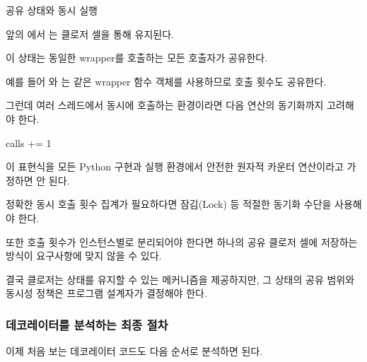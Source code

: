 \begin{dhknote}
\begin{dhksmry}[centered]
공유 상태와 동시 실행
\end{dhksmry}
\end{dhknote}

앞의 에서 는 클로저 셀을 통해 유지된다.

이 상태는 동일한 wrapper를 호출하는 모든 호출자가 공유한다.

예를 들어 와 는 같은 wrapper 함수 객체를 사용하므로 호출 횟수도 공유한다.

그런데 여러 스레드에서 동시에 호출하는 환경이라면 다음 연산의 동기화까지 고려해야 한다.

\begin{dhkcode}
calls += 1
\end{dhkcode}

이 표현식을 모든 Python 구현과 실행 환경에서 안전한 원자적 카운터 연산이라고 가정하면 안 된다.

정확한 동시 호출 횟수 집계가 필요하다면 잠김(Lock) 등 적절한 동기화 수단을 사용해야 한다.

또한 호출 횟수가 인스턴스별로 분리되어야 한다면 하나의 공유 클로저 셀에 저장하는 방식이 요구사항에 맞지 않을 수 있다.

결국 클로저는 상태를 유지할 수 있는 메커니즘을 제공하지만, 그 상태의 공유 범위와 동시성 정책은 프로그램 설계자가 결정해야 한다.

\subsubsection{데코레이터를 분석하는 최종 절차}

이제 처음 보는 데코레이터 코드도 다음 순서로 분석하면 된다.


